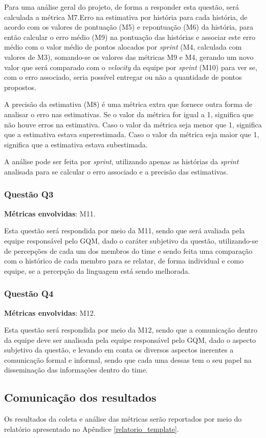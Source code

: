 			Para uma análise geral do projeto, de forma a responder esta questão, será calculada a métrica M7.Erro na estimativa por história para cada história, de acordo com os valores
			de pontuação (M5) e repontuação (M6) da história, para então calcular o erro médio (M9) na pontuação das histórias e associar
			este erro médio com o valor médio de pontos alocados por \textit{sprint} (M4, calculada com valores de M3), somando-se os valores
			das métricas M9 e M4, gerando um novo valor que será comparado com o \textit{velocity} da equipe por \textit{sprint} (M10) para ver se, com o erro associado, seria possível entregar ou não a quantidade de pontos propostos.

			A precisão da estimativa (M8) é uma métrica extra que fornece outra forma de analisar o erro nas estimativas. Se o valor da métrica
			for igual a 1, significa que não houve erros na estimativa. Caso o valor da métrica seja menor que 1, significa que a estimativa estava
			superestimada. Caso o valor da métrica esja maior que 1, significa que a estimativa estava subestimada.

			A análise pode ser feita por \textit{sprint}, utilizando apenas as histórias da \textit{sprint} analisada para se calcular o erro associado e a precisão das estimativas.
		
		\subsubsection{Questão Q3}
		
			\textbf{Métricas envolvidas}: M11.

			Esta questão será respondida por meio da M11, sendo que será avaliada pela equipe responsável pelo GQM, dado o
			caráter subjetivo da questão, utilizando-se de percepções de cada um dos membros do time e sendo feita uma 
			comparação com o histórico de cada membro para se relatar, de forma individual e como equipe, se a percepção da
			linguagem está sendo melhorada.
			
		\subsubsection{Questão Q4}

			\textbf{Métricas envolvidas}: M12.
			
			Esta questão será respondida por meio da M12, sendo que a comunicação dentro da equipe deve ser analisada pela
			equipe responsável pelo GQM, dado o aspecto subjetivo da questão, e levando em conta os diversos aspectos 
			inerentes a comunicação formal e informal, sendo que cada uma dessas tem o seu papel na disseminação das 
			informações dentro do time.
	      
	\subsection{Comunicação dos resultados}

		Os resultados da coleta e análise das métricas serão reportados por meio do relatório apresentado no Apêndice \ref{relatorio_template}.

